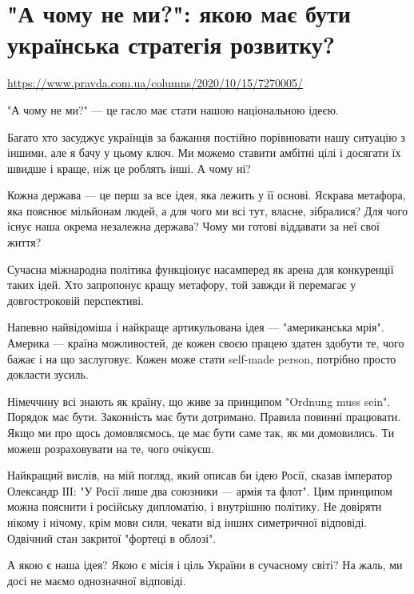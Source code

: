  
 

\section{"А чому не ми?": якою має бути українська стратегія розвитку? }
\label{sec:15_10_2020.news.ua.pravda_com_ua.1_why_not_us}
\url{https://www.pravda.com.ua/columns/2020/10/15/7270005/}

"А чому не ми?" --- це гасло має стати нашою національною ідеєю. 

Багато хто засуджує українців за бажання постійно порівнювати нашу ситуацію з
іншими, але я бачу у цьому ключ. Ми можемо ставити амбітні цілі і досягати їх
швидше і краще, ніж це роблять інші. А чому ні? 

Кожна держава --- це перш за все ідея, яка лежить у її основі. Яскрава метафора,
яка пояснює мільйонам людей, а для чого ми всі тут, власне, зібралися? Для чого
існує наша окрема незалежна держава? Чому ми готові віддавати за неї свої
життя? 

Сучасна міжнародна політика функціонує насамперед як арена для конкуренції
таких ідей. Хто запропонує кращу метафору, той завжди й перемагає у
довгостроковій перспективі.

Напевно найвідоміша і найкраще артикульована ідея --- "американська мрія".
Америка --- країна можливостей, де кожен своєю працею здатен здобути те, чого
бажає і на що заслуговує. Кожен може стати self-made person, потрібно просто
докласти зусиль. 

Німеччину всі знають як країну, що живе за принципом "Ordnung muss sein". Порядок має бути. Законність має бути дотримано. Правила повинні працювати. Якщо ми про щось домовляємось, це має бути саме так, як ми домовились. Ти можеш розраховувати на те, чого очікуєш. 

Найкращий вислів, на мій погляд, який описав би ідею Росії, сказав імператор
Олександр ІІІ: "У Росії лише два союзники --- армія та флот". Цим принципом можна
пояснити і російську дипломатію, і внутрішню політику. Не довіряти нікому і
нічому, крім мови сили, чекати від інших симетричної відповіді. Одвічний стан
закритої "фортеці в облозі". 

А якою є наша ідея? Якою є місія і ціль України в сучасному світі? На жаль, ми
досі не маємо однозначної відповіді.

